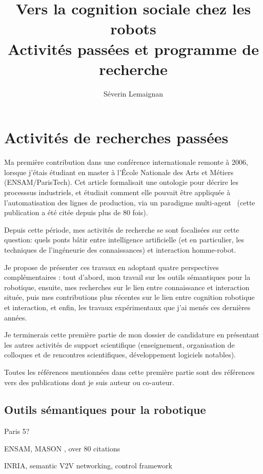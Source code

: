 \documentclass[a4paper]{article}
\title{Vers la cognition sociale chez les robots \\ {\large Activités passées et
programme de recherche}}
\author{Séverin Lemaignan}
\date{}
\begin{document}
\maketitle

\section{Activités de recherches passées}
\newrefsection

Ma première contribution dans une conférence internationale remonte à 2006,
lorsque j'étais étudiant en master à l'École Nationale des Arts et Métiers
(ENSAM/ParisTech). Cet article formalisait une ontologie pour décrire les
processsus industriels, et étudiait comment elle pouvait être appliquée à
l'automatisation des lignes de production, via un paradigme
multi-agent~\cite{lemaignan2006mason} (cette publication a été citée depuis
plus de 80 fois).

Depuis cette période, mes activités de recherche se sont focalisées sur cette
question: quels ponts bâtir entre intelligence artificielle (et en particulier,
les techniques de l'ingéneurie des connaissances) et interaction homme-robot.

Je propose de présenter ces travaux en adoptant quatre perspectives
complémentaires : tout d'abord, mon travail sur les outils sémantiques pour la
robotique, ensuite, mes recherches sur le lien entre connaissance et
interaction située, puis mes contributions plus récentes sur le lien entre
cognition robotique et interaction, et enfin, les travaux expérimentaux que
j'ai menés ces dernières années.

Je terminerais cette première partie de mon dossier de candidature en
présentant les autres activités de support scientifique (enseignement,
organisation de colloques et de rencontres scientifiques, développement
logiciels notables).

Toutes les références mentionnées dans cette première partie sont des références
vers des publications dont je suis auteur ou co-auteur.

\subsection{Outils sémantiques pour la robotique%
  \label{semantic-tools-for-robotics}%
}

Paris 5?

ENSAM, MASON
\cite{lemaignan2006mason}, over 80 citations

INRIA, semantic V2V networking, control framework
\cite{mehani2007networking}
\end{document}
